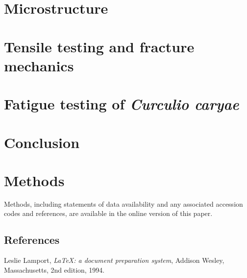 \documentclass[twocolumn, linenumbers, superscriptaddress]{revtex4-1}
\begin{document}
	\section*{Microstructure}
		\lipsum
	
	\section*{Tensile testing and fracture mechanics}
		\lipsum
		
	\section*{Fatigue testing of \textit{Curculio caryae}}
		\lipsum

	\section*{Conclusion}
		\blindtext[3]

	\section*{Methods}
		Methods, including statements of data availability and any associated accession codes and references, are available in the online version of this paper.
	
	\begin{thebibliography}{50}
		\section*{References}	
			Leslie Lamport,
			\textit{\LaTeX: a document preparation system},
			Addison Wesley, Massachusetts,
			2nd edition,
			1994.

	\end{thebibliography}

	\begin{acknowledgements}
		\blindtext
	\end{acknowledgements}
\end{document}
